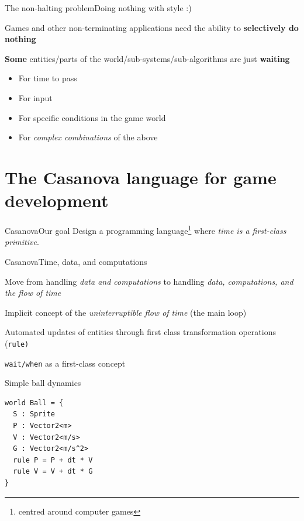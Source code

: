 \documentclass{beamer}
\begin{document}
\begin{slide}{The non-halting problem}{Doing nothing with style :)}{
\item Games and other non-terminating applications need the ability to \textbf{selectively do nothing}
\item \textbf{Some} entities/parts of the world/sub-systems/sub-algorithms are just \textbf{waiting}
\begin{itemize}
\item For time to pass
\item For input
\item For specific conditions in the game world
\item For \textit{complex combinations} of the above
\end{itemize}
}\end{slide}

\section{The Casanova language for game development}
\begin{textslide}{Casanova}{Our goal}{
Design a programming language\footnote{centred around computer games} where \textit{time is a first-class primitive}. \cite{CASANOVA}
}\end{textslide}

\begin{slide}{Casanova}{Time, data, and computations}{
\item Move from handling \textit{data and computations} to handling \textit{data, computations, and the flow of time}
\item Implicit concept of the \textit{uninterruptible flow of time} (the main loop)
\item Automated updates of entities through first class transformation operations (\texttt{rule)}
\item \texttt{wait/when} as a first-class concept
}\end{slide}

\begin{frame}[fragile]{Simple ball dynamics}
\begin{lstlisting}[frame=shadowbox]
world Ball = {
  S : Sprite
  P : Vector2<m>
  V : Vector2<m/s>
  G : Vector2<m/s^2>
  rule P = P + dt * V
  rule V = V + dt * G
}
\end{lstlisting}
\end{frame}
\end{document}
